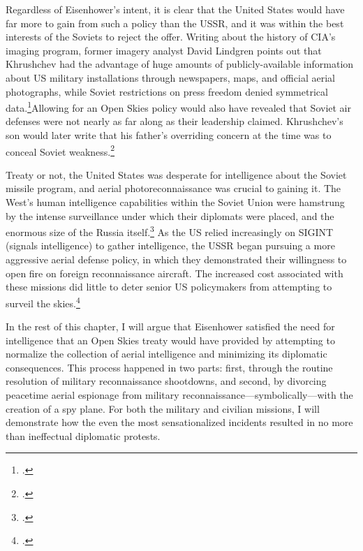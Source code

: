 \documentclass{report}
\begin{document}
\begin{refsegment}
Regardless of Eisenhower's intent, it is clear that the United States would have far more to gain from such a policy than the USSR, and it was within the best interests of the Soviets to reject the offer. Writing about the history of CIA's imaging program, former imagery analyst David Lindgren points out that Khrushchev had the advantage of huge amounts of publicly-available information about US military installations through newspapers, maps, and official aerial photographs, while Soviet restrictions on press freedom denied symmetrical data.\footcite[p.~38]{lindgren_trust_2000}Allowing for an Open Skies policy would also have revealed that Soviet air defenses were not nearly as far along as their leadership claimed. Khrushchev's son would later write that his father's overriding concern at the time was to conceal Soviet weakness.\footcite[p.~133]{brugioni_eyes_2010}

Treaty or not, the United States was desperate for intelligence about the Soviet missile program, and aerial photoreconnaissance was crucial to gaining it. The West's human intelligence capabilities within the Soviet Union were hamstrung by the intense surveillance under which their diplomats were placed, and the enormous size of the Russia itself.\footcite[p.~23]{lindgren_trust_2000} As the US relied increasingly on SIGINT (signals intelligence) to gather intelligence, the USSR began pursuing a more aggressive aerial defense policy, in which they demonstrated their willingness to open fire on foreign reconnaissance aircraft. The increased cost associated with these missions did little to deter senior US policymakers from attempting to surveil the skies.\footcite[p.~4]{pedlow_cia_1998}


In the rest of this chapter, I will argue that Eisenhower satisfied the need for intelligence that an Open Skies treaty would have provided by attempting to normalize the collection of aerial intelligence and minimizing its diplomatic consequences. This process happened in two parts: first, through the routine resolution of military reconnaissance shootdowns, and second, by divorcing peacetime aerial espionage from military reconnaissance---symbolically---with the creation of a spy plane. For both the military and civilian missions, I will demonstrate how the even the most sensationalized incidents resulted in no more than ineffectual diplomatic protests.


\end{refsegment}
\end{document}
